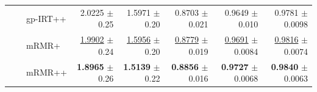 \begin{longtable}{llp{}rrrrr}
 &  & gp-IRT++ & 2.0225 {\scriptsize $\pm$ 0.25} & 1.5971 {\scriptsize $\pm$ 0.20} & 0.8703 {\scriptsize $\pm$ 0.021} & 0.9649 {\scriptsize $\pm$ 0.010} & 0.9781 {\scriptsize $\pm$ 0.0098} \\
 &  & mRMR+ & \underline{1.9902} {\scriptsize $\pm$ 0.24} & \underline{1.5956} {\scriptsize $\pm$ 0.20} & \underline{0.8779} {\scriptsize $\pm$ 0.019} & \underline{0.9691} {\scriptsize $\pm$ 0.0084} & \underline{0.9816} {\scriptsize $\pm$ 0.0074} \\
 &  & mRMR++ & \textbf{1.8965} {\scriptsize $\pm$ 0.26} & \textbf{1.5139} {\scriptsize $\pm$ 0.22} & \textbf{0.8856} {\scriptsize $\pm$ 0.016} & \textbf{0.9727} {\scriptsize $\pm$ 0.0068} & \textbf{0.9840} {\scriptsize $\pm$ 0.0063} \\
\end{longtable}